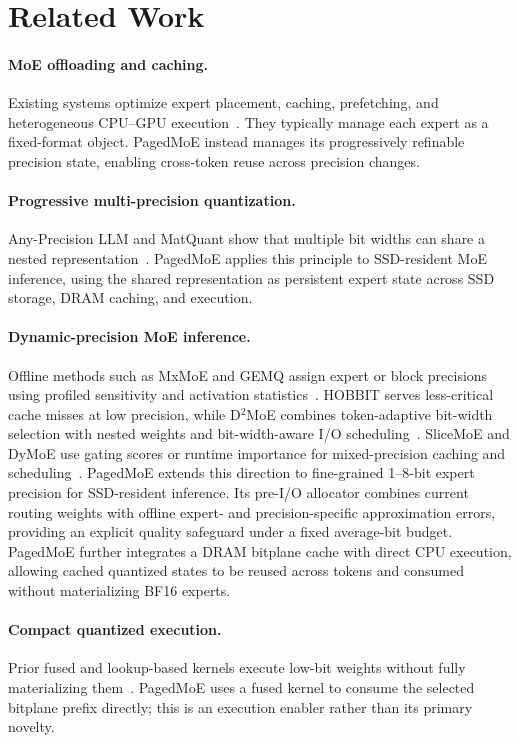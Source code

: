 \documentclass[sigconf, nonacm]{acmart}
\begin{document}
\section{Related Work}

\paragraph{MoE offloading and caching.}
Existing systems optimize expert placement, caching, prefetching, and heterogeneous CPU--GPU execution~\cite{moeinfinity,fiddler,ktransformers}. They typically manage each expert as a fixed-format object. PagedMoE instead manages its progressively refinable precision state, enabling cross-token reuse across precision changes.

\paragraph{Progressive multi-precision quantization.}
Any-Precision LLM and MatQuant show that multiple bit widths can share
a nested representation~\cite{park2024anyprecision,nair2025matquant}.
PagedMoE applies this principle to SSD-resident MoE inference, using
the shared representation as persistent expert state across SSD
storage, DRAM caching, and execution.

\paragraph{Dynamic-precision MoE inference.}
Offline methods such as MxMoE and GEMQ assign expert or block precisions using profiled sensitivity and activation statistics~\cite{mxmoe,gemq}. HOBBIT serves less-critical cache misses at low precision, while D$^{2}$MoE combines token-adaptive bit-width selection with nested weights and bit-width-aware I/O scheduling~\cite{hobbit,d2moe}. SliceMoE and DyMoE use gating scores or runtime importance for mixed-precision caching and scheduling~\cite{slicemoe,dymoe}. PagedMoE extends this direction to fine-grained 1--8-bit expert precision for SSD-resident inference. Its pre-I/O allocator combines current routing weights with offline expert- and precision-specific approximation errors, providing an explicit quality safeguard under a fixed average-bit budget. PagedMoE further integrates a DRAM bitplane cache with direct CPU execution, allowing cached quantized states to be reused across tokens and consumed without materializing BF16 experts.


\paragraph{Compact quantized execution.}
Prior fused and lookup-based kernels execute low-bit weights without fully materializing them~\cite{lutgemm,flute,tmac}. PagedMoE uses a fused kernel to consume the selected bitplane prefix directly; this is an execution enabler rather than its primary novelty.
\end{document}
